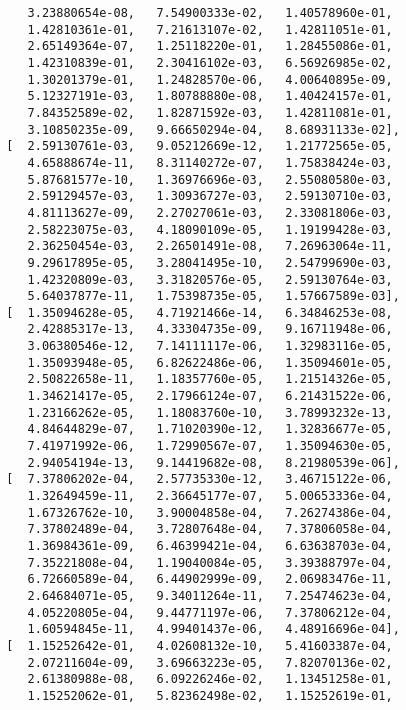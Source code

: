 \documentclass[11pt,a4j,fleqn]{jarticle}
\begin{document}
\begin{verbatim}
          3.23880654e-08,   7.54900333e-02,   1.40578960e-01,
          1.42810361e-01,   7.21613107e-02,   1.42811051e-01,
          2.65149364e-07,   1.25118220e-01,   1.28455086e-01,
          1.42310839e-01,   2.30416102e-03,   6.56926985e-02,
          1.30201379e-01,   1.24828570e-06,   4.00640895e-09,
          5.12327191e-03,   1.80788880e-08,   1.40424157e-01,
          7.84352589e-02,   1.82871592e-03,   1.42811081e-01,
          3.10850235e-09,   9.66650294e-04,   8.68931133e-02],
       [  2.59130761e-03,   9.05212669e-12,   1.21772565e-05,
          4.65888674e-11,   8.31140272e-07,   1.75838424e-03,
          5.87681577e-10,   1.36976696e-03,   2.55080580e-03,
          2.59129457e-03,   1.30936727e-03,   2.59130710e-03,
          4.81113627e-09,   2.27027061e-03,   2.33081806e-03,
          2.58223075e-03,   4.18090109e-05,   1.19199428e-03,
          2.36250454e-03,   2.26501491e-08,   7.26963064e-11,
          9.29617895e-05,   3.28041495e-10,   2.54799690e-03,
          1.42320809e-03,   3.31820576e-05,   2.59130764e-03,
          5.64037877e-11,   1.75398735e-05,   1.57667589e-03],
       [  1.35094628e-05,   4.71921466e-14,   6.34846253e-08,
          2.42885317e-13,   4.33304735e-09,   9.16711948e-06,
          3.06380546e-12,   7.14111117e-06,   1.32983116e-05,
          1.35093948e-05,   6.82622486e-06,   1.35094601e-05,
          2.50822658e-11,   1.18357760e-05,   1.21514326e-05,
          1.34621417e-05,   2.17966124e-07,   6.21431522e-06,
          1.23166262e-05,   1.18083760e-10,   3.78993232e-13,
          4.84644829e-07,   1.71020390e-12,   1.32836677e-05,
          7.41971992e-06,   1.72990567e-07,   1.35094630e-05,
          2.94054194e-13,   9.14419682e-08,   8.21980539e-06],
       [  7.37806202e-04,   2.57735330e-12,   3.46715122e-06,
          1.32649459e-11,   2.36645177e-07,   5.00653336e-04,
          1.67326762e-10,   3.90004858e-04,   7.26274386e-04,
          7.37802489e-04,   3.72807648e-04,   7.37806058e-04,
          1.36984361e-09,   6.46399421e-04,   6.63638703e-04,
          7.35221808e-04,   1.19040084e-05,   3.39388797e-04,
          6.72660589e-04,   6.44902999e-09,   2.06983476e-11,
          2.64684071e-05,   9.34011264e-11,   7.25474623e-04,
          4.05220805e-04,   9.44771197e-06,   7.37806212e-04,
          1.60594845e-11,   4.99401437e-06,   4.48916696e-04],
       [  1.15252642e-01,   4.02608132e-10,   5.41603387e-04,
          2.07211604e-09,   3.69663223e-05,   7.82070136e-02,
          2.61380988e-08,   6.09226246e-02,   1.13451258e-01,
          1.15252062e-01,   5.82362498e-02,   1.15252619e-01,

\end{verbatim}
\end{document}
